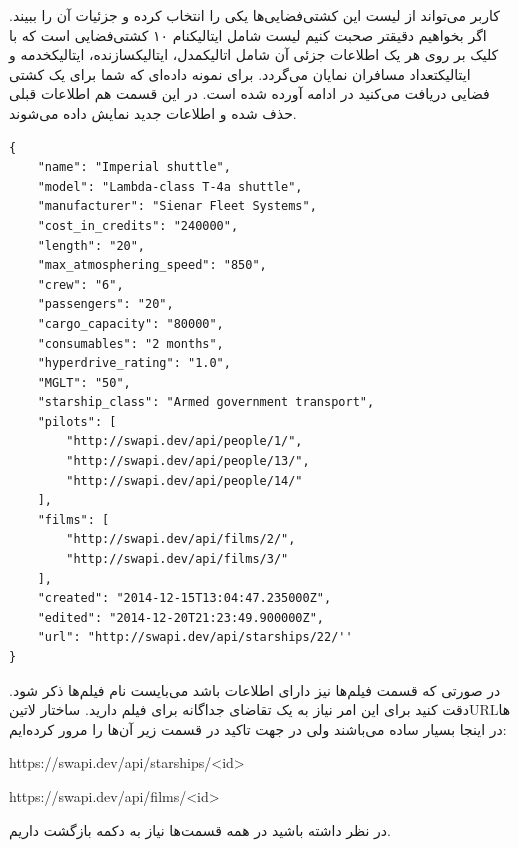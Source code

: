 \documentclass[../main.tex]{subfiles}
\begin{document}
کاربر می‌تواند از لیست این کشتی‌فضایی‌ها یکی را انتخاب کرده و جزئیات آن را ببیند.
اگر بخواهیم دقیقتر صحبت کنیم لیست شامل ‌ایتالیک{نام} ۱۰ کشتی‌فضایی است
که با کلیک بر روی هر یک اطلاعات جزئی آن شامل ‌اتالیک{مدل}، ‌ایتالیک{سازنده}، ‌ایتالیک{خدمه} و ‌ایتالیک{تعداد مسافران} نمایان می‌گردد.
برای نمونه داده‌ای که شما برای یک کشتی فضایی دریافت می‌کنید در ادامه آورده شده است.
در این قسمت هم اطلاعات قبلی حذف شده و اطلاعات جدید نمایش داده می‌شوند.

\begin{latin}
\begin{verbatim}
{
    "name": "Imperial shuttle",
    "model": "Lambda-class T-4a shuttle",
    "manufacturer": "Sienar Fleet Systems",
    "cost_in_credits": "240000",
    "length": "20",
    "max_atmosphering_speed": "850",
    "crew": "6",
    "passengers": "20",
    "cargo_capacity": "80000",
    "consumables": "2 months",
    "hyperdrive_rating": "1.0",
    "MGLT": "50",
    "starship_class": "Armed government transport",
    "pilots": [
        "http://swapi.dev/api/people/1/",
        "http://swapi.dev/api/people/13/",
        "http://swapi.dev/api/people/14/"
    ],
    "films": [
        "http://swapi.dev/api/films/2/",
        "http://swapi.dev/api/films/3/"
    ],
    "created": "2014-12-15T13:04:47.235000Z",
    "edited": "2014-12-20T21:23:49.900000Z",
    "url": "http://swapi.dev/api/starships/22/''
}
\end{verbatim}
\end{latin}

در صورتی که قسمت فیلم‌ها نیز دارای اطلاعات باشد می‌بایست نام فیلم‌ها ذکر شود.
دقت کنید برای این امر نیاز به یک تقاضای جداگانه برای فیلم دارید. ساختار ‌لاتین{URL}ها در اینجا بسیار ساده می‌باشند ولی در جهت تاکید در قسمت زیر آن‌ها را مرور کرده‌ایم:

\begin{itemize}\begin{latinitems}
  \item https://swapi.dev/api/starships/<id>
  \item https://swapi.dev/api/films/<id>
\end{latinitems}\end{itemize}

در نظر داشته باشید در همه قسمت‌ها نیاز به دکمه بازگشت داریم.

\end{document}
